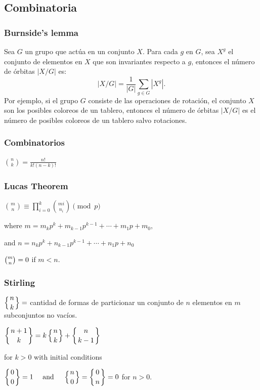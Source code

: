 \subsection{Combinatoria}
{
\subsubsection{Burnside's lemma}
{
Sea $G$ un grupo que actúa en un conjunto $X$. Para cada $g$ en $G$, sea $X^{g}$ el conjunto de elementos
en $X$ que son invariantes respecto a $g$, entonces el número de órbitas $|X/G|$ es:
\[ |X/G|={\frac {1}{|G|}}\sum _{{g\in G}}|X^{g}|.\]
Por ejemplo, si el grupo $G$ consiste de las operaciones de rotación, el conjunto $X$ son los posibles coloreos de un tablero, 
entonces el número de órbitas $|X/G|$ es el número de posibles coloreos de un tablero salvo rotaciones.
}

\subsubsection{Combinatorios}
{
\(\displaystyle \binom{n}{k} = \frac{n!}{k!(n-k)!} \)
}

\subsubsection{Lucas Theorem}
{
    \(\displaystyle {\binom {m}{n}}\equiv \prod_{i=0}^{k}{\binom {m{i}}{n_{i}}}{\pmod{p}}\)

where \({\displaystyle m=m_{k}p^{k}+m_{k-1}p^{k-1}+\cdots +m_{1}p+m_{0},}\)

and \({\displaystyle n=n_{k}p^{k}+n_{k-1}p^{k-1}+\cdots +n_{1}p+n_{0}}\)

\({\displaystyle {\tbinom {m}{n}}=0}\) if \(m < n\).


}
\subsubsection{Stirling}
{
\(\displaystyle \left\{{n \atop k}\right\} = \) cantidad de formas de particionar un conjunto de \(n\) elementos en \(m\) subconjuntos no vacíos.

\(\displaystyle \left\{{n+1\atop k}\right\} = k \left\{{ n \atop k }\right\} + \left\{{n\atop k-1}\right\}\)

for \(k > 0\) with initial conditions

\({\displaystyle \left\{{0 \atop 0}\right\}=1\quad {\mbox{ and }}\quad \left\{{n \atop 0}\right\}=\left\{{0 \atop n}\right\}=0}\)
for \(n > 0\).


}}
